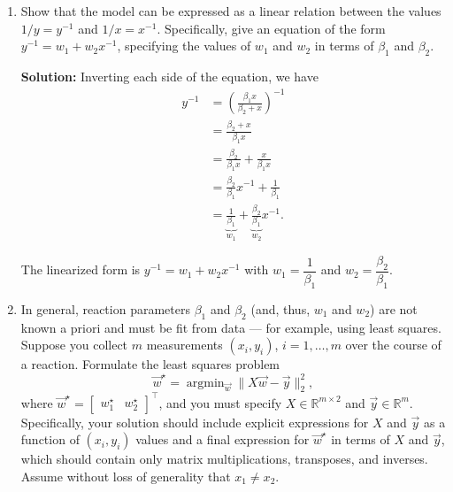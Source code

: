 \documentclass[10pt]{article}
\theoremstyle{definition}
\theoremstyle{plain}
\newcommand{\RR}{\mathbb{R}}
\DeclareMathOperator{\argmin}{argmin}
\begin{document}
\begin{enumerate}[label=(\alph*)]
    \item Show that the model can be expressed as a linear relation between the values $1/y = y^{-1}$ and $1/x = x^{-1}$. Specifically, give an equation of the form $y^{-1} = w_1 + w_2 x^{-1}$, specifying the values of $w_1$ and $w_2$ in terms of $\beta_1$ and $\beta_2$.

    \textbf{Solution:} Inverting each side of the equation, we have
    \begin{align}
        y^{-1} &= \left( \frac{\beta_1 x}{\beta_2 + x} \right)^{-1} \\
        &= \frac{\beta_2 + x}{\beta_1 x} \\
        &= \frac{\beta_2}{\beta_1 x} + \frac{x}{\beta_1 x} \\
        &= \frac{\beta_2}{\beta_1} x^{-1} + \frac{1}{\beta_1} \\
        &= \underbrace{\frac{1}{\beta_1}}_{w_1} + \underbrace{\frac{\beta_2}{\beta_1}}_{w_2} x^{-1}.
    \end{align}

    \begin{result}
    The linearized form is $y^{-1} = w_1 + w_2 x^{-1}$ with $w_1 = \dfrac{1}{\beta_1}$ and $w_2 = \dfrac{\beta_2}{\beta_1}$.
    \end{result}

    \item In general, reaction parameters $\beta_1$ and $\beta_2$ (and, thus, $w_1$ and $w_2$) are not known a priori and must be fit from data --- for example, using least squares. Suppose you collect $m$ measurements $(x_i, y_i)$, $i = 1, \ldots, m$ over the course of a reaction. Formulate the least squares problem
    \begin{equation}
        \vec{w}^\star = \argmin_{\vec{w}} \|X\vec{w} - \vec{y}\|_2^2,
    \end{equation}
    where $\vec{w}^\star = \begin{bmatrix} w_1^\star & w_2^\star \end{bmatrix}^\top$, and you must specify $X \in \RR^{m \times 2}$ and $\vec{y} \in \RR^m$. Specifically, your solution should include explicit expressions for $X$ and $\vec{y}$ as a function of $(x_i, y_i)$ values and a final expression for $\vec{w}^\star$ in terms of $X$ and $\vec{y}$, which should contain only matrix multiplications, transposes, and inverses. Assume without loss of generality that $x_1 \neq x_2$.


\end{enumerate}
\end{document}
